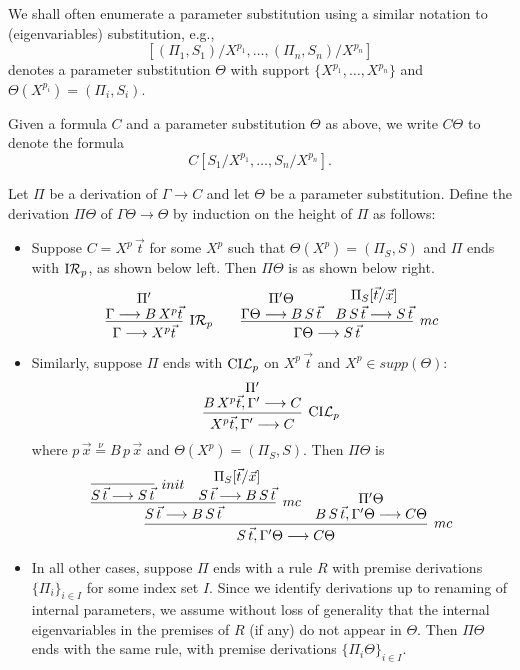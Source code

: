 \documentclass[preprint]{elsarticle}
\newcommand{\Seq}[2]{#1\longrightarrow #2}
\newcommand{\defnu}{\stackrel{\nu}{=}}
\newcommand{\indRP}{{\rm I}{\cal R}_p}
\newcommand{\coindLP}{{\rm CI}{\cal L}_p}
\begin{document}
We shall often enumerate a parameter substitution using a similar
notation to (eigenvariables) substitution, e.g.,
$$
[(\Pi_1,S_1)/X^{p_1}, \ldots, (\Pi_n, S_n)/ X^{p_n}]
$$
denotes a parameter substitution $\Theta$ with support $\{X^{p_1},
\ldots, X^{p_n}\}$ and $\Theta(X^{p_i}) = (\Pi_i, S_i)$.

Given a formula $C$ and a parameter substitution $\Theta$ as above, we
write $C\Theta$ to denote the formula
$$
C[S_1/X^{p_1}, \ldots, S_n/X^{p_n}].
$$

\begin{definition}
  Let $\Pi$ be a derivation of $\Seq{\Gamma}{C}$ and let $\Theta$ be a
  parameter substitution.  Define the derivation $\Pi\Theta$ of
  $\Seq{\Gamma\Theta}{\Theta}$ by induction on the height of $\Pi$
  as follows:
  \begin{itemize}
  \item Suppose $C = X^p\,\vec t$ for some $X^p$ such that $\Theta(X^p) =
(\Pi_S, S)$ and $\Pi$ ends with $\indRP$, as shown below left. 
Then $\Pi\Theta$ is as shown below right. 
$$
\infer[\indRP] 
{\Seq \Gamma {X^p \vec t}} 
{\deduce{\Seq \Gamma {B\,X^p \vec t}}{\Pi'}}
\qquad
\infer[mc] {\Seq {\Gamma\Theta}{S\,\vec t}} { \deduce{\Seq
    {\Gamma\Theta}{B\,S\,\vec t}}{\Pi'\Theta} & \deduce{\Seq
    {B\,S\,\vec t}{S\,\vec t}}{\Pi_S[\vec t/\vec x]} }
$$



\item Similarly, suppose  $\Pi$ ends with $\coindLP$ on $X^p\,\vec t$
and $X^p \in supp(\Theta)$:
$$
\infer[\coindLP] {\Seq {X^p \vec t, \Gamma'}{C}} {
  \deduce{\Seq{B\,X^p\vec t, \Gamma'}{C}}{\Pi'} }
$$
where $p\,\vec x \defnu B\,p\,\vec x$ and $\Theta(X^p) = (\Pi_S, S)$.  
Then $\Pi\Theta$ is
$$
\infer[mc] {\Seq{S\,\vec t, \Gamma'\Theta}{C\Theta}} { \infer[mc]
  {\Seq {S\,\vec t}{B\,S\,\vec t}} { \infer[init] {\Seq {S\,\vec
        t}{S\,\vec t}}{} & \deduce{\Seq {S\,\vec t}{B\,S\,\vec
        t}}{\Pi_S[\vec t/\vec x]} } & \deduce{\Seq{B\,S\,\vec t,
      \Gamma'\Theta}{C\Theta}}{\Pi'\Theta} }
$$ 



\item In all other cases, suppose $\Pi$ ends with a rule $R$ with
  premise derivations $\{\Pi_i \}_{i \in I}$ for some index set $I$.
  Since we identify derivations up to renaming of internal parameters,
  we assume without loss of generality that the internal
  eigenvariables in the premises of $R$ (if any) do not appear in
  $\Theta$.  Then $\Pi\Theta$ ends with the same rule, with premise
  derivations $\{\Pi_i\Theta \}_{i \in I}$.
\end{itemize}

\end{definition}
\end{document}
